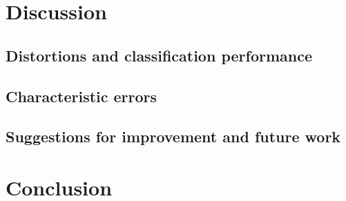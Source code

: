 \documentclass[10pt]{article}
\begin{document}
	\section{Discussion}
	\subsection{Distortions and classification performance}
	\subsection{Characteristic errors}
	\subsection{Suggestions for improvement and future work}
	
	\section{Conclusion}
	
	
\end{document}
